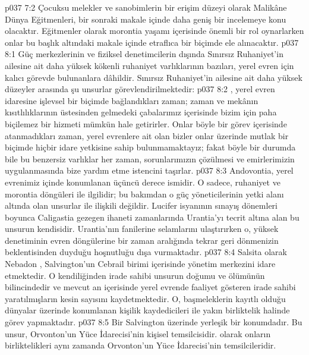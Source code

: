 \vs p037 7:2 Çocuksu melekler ve sanobimlerin bir erişim düzeyi olarak Malikâne Dünya Eğitmenleri, bir sonraki makale içinde daha geniş bir incelemeye konu olacaktır. Eğitmenler olarak morontia yaşamı içerisinde önemli bir rol oynarlarken onlar bu başlık altındaki makale içinde etraflıca bir biçimde ele alınacaktır.
\vs p037 8:1 Güç merkezlerinin ve fiziksel denetimcilerin dışında Sınırsız Ruhaniyet’in ailesine ait daha yüksek kökenli ruhaniyet varlıklarının bazıları, yerel evren için kalıcı görevde bulunanlara dâhildir. Sınırsız Ruhaniyet’in ailesine ait daha yüksek düzeyler arasında şu unsurlar görevlendirilmektedir:
\vs p037 8:2 , yerel evren idaresine işlevsel bir biçimde bağlandıkları zaman; zaman ve mekânın kısıtlılıklarının üstesinden gelmedeki çabalarımız içerisinde bizim için paha biçilemez bir hizmeti mümkün hale getirirler. Onlar böyle bir görev içerisinde atanmadıkları zaman, yerel evrenlere ait olan bizler onlar üzerinde mutlak bir biçimde hiçbir idare yetkisine sahip bulunmamaktayız; fakat böyle bir durumda bile bu benzersiz varlıklar her zaman, sorunlarımızın çözülmesi ve emirlerimizin uygulanmasında bize yardım etme istencini taşırlar.
\vs p037 8:3 Andovontia, yerel evrenimiz içinde konumlanan üçüncü derece  ismidir. O sadece, ruhaniyet ve morontia döngüleri ile ilgilidir; bu bakımdan o güç yöneticilerinin yetki alanı altında olan unsurlar ile ilişkili değildir. Lucifer isyanının sınayış dönemleri boyunca Caligastia gezegen ihaneti zamanlarında Urantia’yı tecrit altına alan bu unsurun kendisidir. Urantia’nın fanilerine selamlarını ulaştırırken o, yüksek denetiminin evren döngülerine bir zaman aralığında tekrar geri dönmenizin beklentisinden duyduğu hoşnutluğu dışa vurmaktadır.
\vs p037 8:4 Salsita olarak Nebadon , Salvington’un Cebrail birimi içerisinde yönetim merkezini idare etmektedir. O kendiliğinden irade sahibi unsurun doğumu ve ölümünün bilincindedir ve mevcut an içerisinde yerel evrende faaliyet gösteren irade sahibi yaratılmışların kesin sayısını kaydetmektedir. O, başmeleklerin kayıtlı olduğu dünyalar üzerinde konumlanan kişilik kaydedicileri ile yakın birliktelik halinde görev yapmaktadır.
\vs p037 8:5 Bir  Salvington üzerinde yerleşik bir konumdadır. Bu unsur, Orvonton’un Yüce İdarecisi’nin kişisel temsilcisidir.  olarak onların birliktelikleri aynı zamanda Orvonton’un Yüce İdarecisi’nin temsilcileridir.
